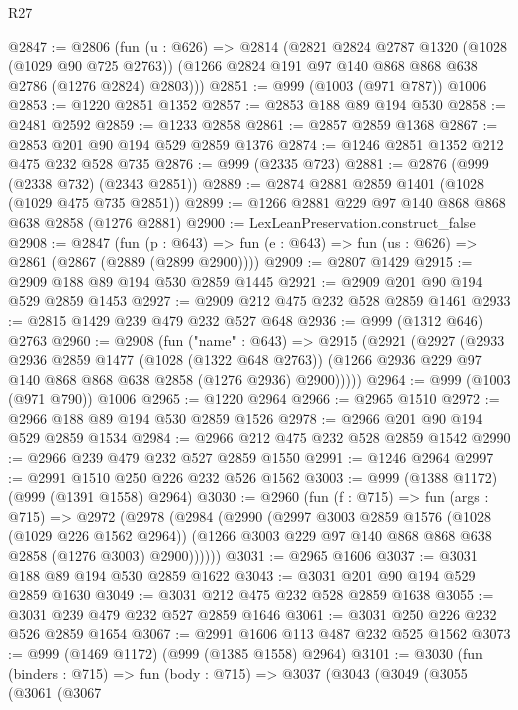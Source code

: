 \begin{lexlean}{R27}
\begin{coremodule}
@2847 := @2806
    (fun (u : @626) =>
    @2814
      (@2821
        @2824
        @2787
        @1320
        (@1028 (@1029 @90 @725 @2763))
        (@1266 @2824 @191 @97 @140 @868 @868 @638 @2786 (@1276 @2824) @2803)))
@2851 := @999 (@1003 (@971 @787)) @1006
@2853 := @1220 @2851 @1352
@2857 := @2853 @188 @89 @194 @530
@2858 := @2481 @2592
@2859 := @1233 @2858
@2861 := @2857 @2859 @1368
@2867 := @2853 @201 @90 @194 @529 @2859 @1376
@2874 := @1246 @2851 @1352 @212 @475 @232 @528 @735
@2876 := @999 (@2335 @723)
@2881 := @2876 (@999 (@2338 @732) (@2343 @2851))
@2889 := @2874 @2881 @2859 @1401 (@1028 (@1029 @475 @735 @2851))
@2899 := @1266 @2881 @229 @97 @140 @868 @868 @638 @2858 (@1276 @2881)
@2900 := LexLeanPreservation.construct_false
@2908 := @2847
    (fun (p : @643) => fun (e : @643) => fun (us : @626) => @2861 (@2867 (@2889 (@2899 @2900))))
@2909 := @2807 @1429
@2915 := @2909 @188 @89 @194 @530 @2859 @1445
@2921 := @2909 @201 @90 @194 @529 @2859 @1453
@2927 := @2909 @212 @475 @232 @528 @2859 @1461
@2933 := @2815 @1429 @239 @479 @232 @527 @648
@2936 := @999 (@1312 @646) @2763
@2960 := @2908
    (fun ("name" : @643) =>
    @2915
      (@2921
        (@2927
          (@2933
            @2936
            @2859
            @1477
            (@1028 (@1322 @648 @2763))
            (@1266 @2936 @229 @97 @140 @868 @868 @638 @2858 (@1276 @2936) @2900)))))
@2964 := @999 (@1003 (@971 @790)) @1006
@2965 := @1220 @2964
@2966 := @2965 @1510
@2972 := @2966 @188 @89 @194 @530 @2859 @1526
@2978 := @2966 @201 @90 @194 @529 @2859 @1534
@2984 := @2966 @212 @475 @232 @528 @2859 @1542
@2990 := @2966 @239 @479 @232 @527 @2859 @1550
@2991 := @1246 @2964
@2997 := @2991 @1510 @250 @226 @232 @526 @1562
@3003 := @999 (@1388 @1172) (@999 (@1391 @1558) @2964)
@3030 := @2960
    (fun (f : @715) =>
    fun (args : @715) =>
    @2972
      (@2978
        (@2984
          (@2990
            (@2997
              @3003
              @2859
              @1576
              (@1028 (@1029 @226 @1562 @2964))
              (@1266 @3003 @229 @97 @140 @868 @868 @638 @2858 (@1276 @3003) @2900))))))
@3031 := @2965 @1606
@3037 := @3031 @188 @89 @194 @530 @2859 @1622
@3043 := @3031 @201 @90 @194 @529 @2859 @1630
@3049 := @3031 @212 @475 @232 @528 @2859 @1638
@3055 := @3031 @239 @479 @232 @527 @2859 @1646
@3061 := @3031 @250 @226 @232 @526 @2859 @1654
@3067 := @2991 @1606 @113 @487 @232 @525 @1562
@3073 := @999 (@1469 @1172) (@999 (@1385 @1558) @2964)
@3101 := @3030
    (fun (binders : @715) =>
    fun (body : @715) =>
    @3037
      (@3043
        (@3049
          (@3055
            (@3061
              (@3067

\end{coremodule}
\end{lexlean}
